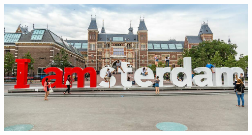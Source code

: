 \documentclass{article}
\begin{document}
\begin{multicols}{3}
\begin{center}
    \vspace{1cm}
    \includegraphics[width=35cm,height=27cm]{media/images/rijksmuseum-amsterdam-museum-iamsterdam.jpg}
\end{center}

%

\end{multicols}
\end{document}

